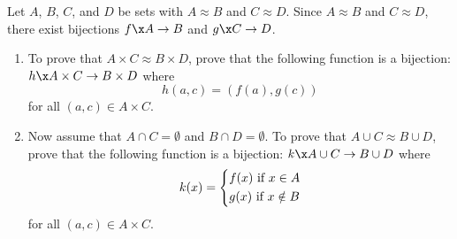 \begin{activity} \label{A:theoremequivsets}

Let $A$, $B$, $C$, and $D$ be sets with $A \approx B$ and $C \approx D$.  Since $A \approx B$ and 
$C \approx D$, there exist bijections $f\x A \to B$ and $g\x C \to D$.

\begin{enumerate}
\item To prove that $A \times C \approx B \times D$, prove that the following function is a bijection:  $h\x A \times C \to B \times D$ where
\[
h ( a, c ) = ( f ( a ), g ( c ) )
\]
for all $( a, c ) \in A \times C$.

\item Now assume that $A \cap C = \emptyset$ and $B \cap D = \emptyset$.  To prove that 
$A \cup C \approx B \cup D$, prove that the following function is a bijection:  
$k\x A \cup C \to B \cup D$ where
\[
k ( x ) = \left\{ \begin{gathered}
  f ( x ) \text{  if  }x \in A \hfill \\
  g ( x ) \text{  if  }x \notin B \hfill \\ 
\end{gathered}  \right.
\]
for all $( a, c ) \in A \times C$.
\end{enumerate}
\end{activity}
\hbreak

